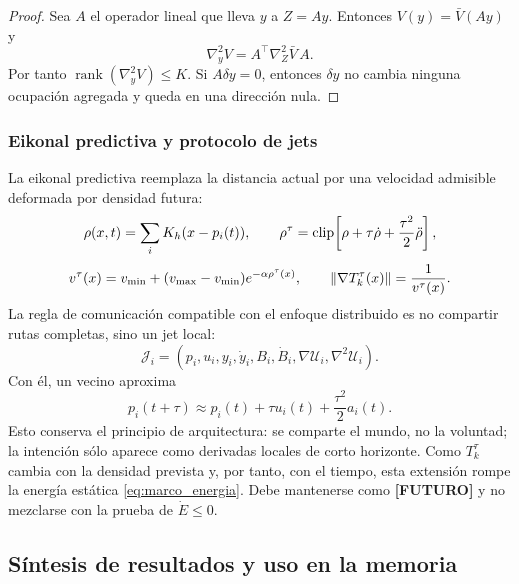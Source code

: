 \begin{proof}
Sea $A$ el operador lineal que lleva $y$ a $Z=Ay$. Entonces
$V(y)=\bar V(Ay)$ y
\[
  \nabla_y^2V=A^\top\nabla_Z^2\bar V\,A.
\]
Por tanto $\operatorname{rank}(\nabla_y^2V)\le K$. Si $A\delta y=0$, entonces
$\delta y$ no cambia ninguna ocupación agregada y queda en una dirección nula.
\end{proof}

\subsubsection{Eikonal predictiva y protocolo de jets}

La eikonal predictiva reemplaza la distancia actual por una velocidad admisible
deformada por densidad futura:
\[
  \rho(x,t)=\sum_i K_h(x-p_i(t)),
  \qquad
  \rho^\tau=\operatorname{clip}\!\left[\rho+\tau\dot\rho+\frac{\tau^2}{2}\ddot\rho\right],
\]
\[
  v^\tau(x)=v_{\min}+(v_{\max}-v_{\min})e^{-\alpha\rho^\tau(x)},
  \qquad
  \left\|\nabla T_k^\tau(x)\right\|=\frac{1}{v^\tau(x)}.
\]
La regla de comunicación compatible con el enfoque distribuido es no compartir rutas
completas, sino un jet local:
\[
  \mathcal{J}_i=(p_i,u_i,y_i,\dot y_i,B_i,\dot B_i,\nabla\mathcal{U}_i,
  \nabla^2\mathcal{U}_i).
\]
Con él, un vecino aproxima
\[
  p_i(t+\tau)\approx p_i(t)+\tau u_i(t)+\frac{\tau^2}{2}a_i(t).
\]
Esto conserva el principio de arquitectura: se comparte el mundo, no la voluntad; la
intención sólo aparece como derivadas locales de corto horizonte.
Como $T_k^\tau$ cambia con la densidad prevista y, por tanto, con el tiempo, esta
extensión rompe la energía estática \eqref{eq:marco_energia}. Debe mantenerse como
\textbf{[FUTURO]} y no mezclarse con la prueba de $\dot E\le0$.

\subsection{Síntesis de resultados y uso en la memoria}


